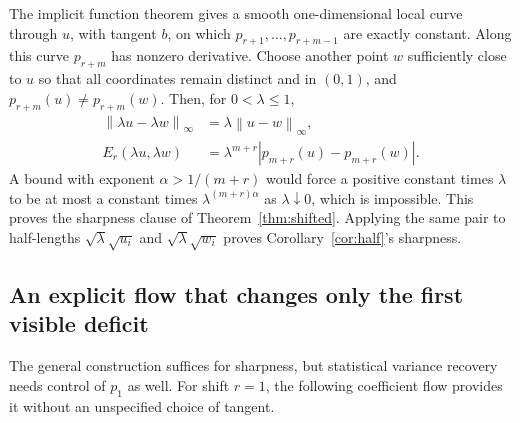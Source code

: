 \documentclass[11pt,a4paper]{article}
\numberwithin{equation}{section}
\theoremstyle{definition}
\theoremstyle{remark}
\newcommand{\norm}[1]{\left\lVert#1\right\rVert}
\begin{document}
The implicit function theorem gives a smooth one-dimensional local curve
through $u$, with tangent $b$, on which $p_{r+1},\ldots,p_{r+m-1}$ are exactly
constant. Along this curve $p_{r+m}$ has nonzero derivative. Choose another
point $w$ sufficiently close to $u$ so that all coordinates remain distinct
and in $(0,1)$, and $p_{r+m}(u)\ne p_{r+m}(w)$. Then, for $0<\lambda\le1$,
\begin{align}
 \norm{\lambda u-\lambda w}_\infty
   &=\lambda\norm{u-w}_\infty,\\
 E_r(\lambda u,\lambda w)
   &=\lambda^{m+r}|p_{m+r}(u)-p_{m+r}(w)|.
 \label{eq:sharp-scaled}
\end{align}
A bound with exponent $\alpha>1/(m+r)$ would force a positive constant times
$\lambda$ to be at most a constant times $\lambda^{(m+r)\alpha}$ as
$\lambda\downarrow0$, which is impossible. This proves the sharpness clause
of Theorem~\ref{thm:shifted}. Applying the same pair to half-lengths
$\sqrt\lambda\sqrt{u_i}$ and $\sqrt\lambda\sqrt{w_i}$ proves
Corollary~\ref{cor:half}'s sharpness.

\subsection{An explicit flow that changes only the first visible deficit}
The general construction suffices for sharpness, but statistical variance
recovery needs control of $p_1$ as well. For shift $r=1$, the following
coefficient flow provides it without an unspecified choice of tangent.
\end{document}
